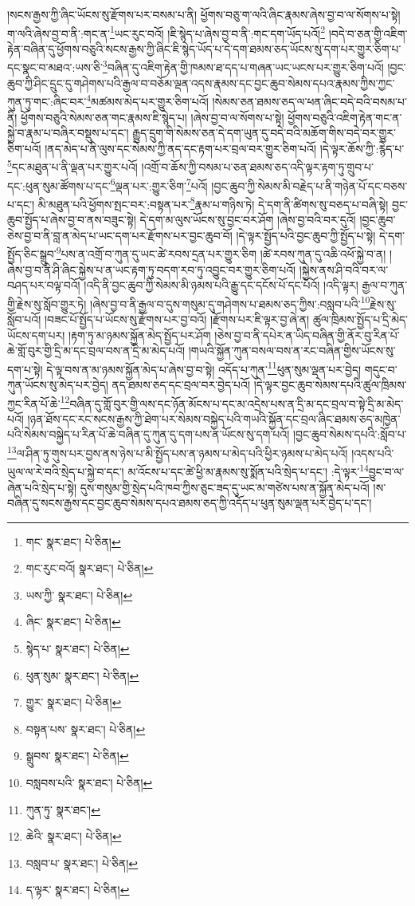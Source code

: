 །སངས་རྒྱས་ཀྱི་ཞིང་ཡོངས་སུ་རྫོགས་པར་བསམ་པ་ནི། ཕྱོགས་བཅུ་ག་ལའི་ཞིང་རྣམས་ཞེས་བྱ་བ་ལ་སོགས་པ་སྟེ། ག་ལའི་ཞེས་བྱ་བ་ནི་:གང་ན་\footnote{གང་  སྣར་ཐང་།  པེ་ཅིན། }ཡང་རུང་བའོ། །ཇི་སྙེད་པ་ཞེས་བྱ་བ་ནི་:གང་དག་ཡོད་པའོ།\footnote{གང་རུང་བའོ།  སྣར་ཐང་།  པེ་ཅིན། } །བདེ་བ་ཅན་གྱི་འཇིག་རྟེན་བཞིན་དུ་ཕྱོགས་བཅུའི་སངས་རྒྱས་ཀྱི་ཞིང་ཇི་སྙེད་ཡོད་པ་དེ་དག་ཐམས་ཅད་ཡོངས་སུ་དག་པར་གྱུར་ཅིག་པ་དང་སྣང་བ་མཐའ་:ཡས་ཅི་\footnote{ཡས་ཀྱི་  སྣར་ཐང་།  པེ་ཅིན། }བཞིན་དུ་འཇིག་རྟེན་གྱི་ཁམས་ཐ་དད་པ་གཞན་ཡང་ཡངས་པར་གྱུར་ཅིག་པའོ། །བྱང་ཆུབ་ཀྱི་ཤིང་དྲུང་དུ་གཤེགས་པའི་རྒྱལ་བ་བཅོམ་ལྡན་འདས་རྣམས་དང་བྱང་ཆུབ་སེམས་དཔའ་རྣམས་ཀྱིས་ཀྱང་ཀུན་ཏུ་གང་:ཞིང་བར་\footnote{ཞིང་  སྣར་ཐང་།  པེ་ཅིན། }མཚམས་མེད་པར་གྱུར་ཅིག་པའོ། །སེམས་ཅན་ཐམས་ཅད་ལ་ཕན་ཞིང་བདེ་བའི་བསམ་པ་ནི། ཕྱོགས་བཅུའི་སེམས་ཅན་གང་རྣམས་ཇི་སྙེད་པ། །ཞེས་བྱ་བ་ལ་སོགས་པ་སྟེ། ཕྱོགས་བཅུའི་འཇིག་རྟེན་གང་ན་སྐྱེ་བ་རྣམ་པ་བཞིར་བསྡུས་པ་དང་། རྒྱུད་དྲུག་གི་སེམས་ཅན་དེ་དག་ཡུན་དུ་བདེ་བའི་མཆོག་གིས་བདེ་བར་གྱུར་ཅིག་པའོ། །ནད་མེད་པ་ནི་ལུས་དང་སེམས་ཀྱི་ནད་དང་རྟག་པར་བྲལ་བར་གྱུར་ཅིག་པའོ། །དེ་ལྟར་ཆོས་ཀྱི་:རྙེད་པ་\footnote{སྙེད་པ་  སྣར་ཐང་།  པེ་ཅིན། }དང་མཐུན་པ་ནི་ལྡན་པར་གྱུར་པའོ། །འགྲོ་བ་ཆོས་ཀྱི་བསམ་པ་ཅན་ཐམས་ཅད་འདི་ལྟར་རྟག་ཏུ་གྲུབ་པ་དང་:ཕུན་སུམ་ཚོགས་པ་དང་\footnote{ཕུན་སུམ་  སྣར་ཐང་།  པེ་ཅིན། }ལྡན་པར་:གྱུར་ཅིག་\footnote{གྱུར་  སྣར་ཐང་།  པེ་ཅིན། }པའོ། །བྱང་ཆུབ་ཀྱི་སེམས་མི་བརྗེད་པ་ནི་གཉེན་པོ་དང་བཅས་པ་དང་། མི་མཐུན་པའི་ཕྱོགས་སྤང་བར་:བསྟན་པར་\footnote{བསྟན་པས་  སྣར་ཐང་།  པེ་ཅིན། }རྣམ་པ་གཉིས་ཏེ། དེ་དག་ནི་ཚིགས་སུ་བཅད་པ་བཞི་སྟེ། བྱང་ཆུབ་སྤྱོད་པ་ཞེས་བྱ་བ་ནས་བཟུང་སྟེ། དེ་དག་མ་ལུས་ཡོངས་སུ་བྱང་བར་ཤོག །ཞེས་བྱ་བའི་བར་དུའོ། །བྱང་ཆུབ་ཅེས་བྱ་བ་ནི་བླ་ན་མེད་པ་ཡང་དག་པར་རྫོགས་པར་བྱང་ཆུབ་བོ། །དེ་ལྟར་སྤྱོད་པའི་བྱང་ཆུབ་ཀྱི་སྤྱོད་པ་སྟེ། དེ་དག་སྤྱོད་ཅིང་སྒྲུབ་\footnote{སྒྲུབས་  སྣར་ཐང་།  པེ་ཅིན། }པས་ན་འགྲོ་བ་ཀུན་དུ་ཡང་ཚེ་རབས་དྲན་པར་གྱུར་ཅིག །ཚེ་རབས་ཀུན་དུ་འཆི་འཕོ་སྐྱེ་བ་ན། །ཞེས་བྱ་བ་ནི་ཤི་ཞིང་སྐྱེས་པ་ན་ཡང་རྟག་ཏུ་བདག་རབ་ཏུ་འབྱུང་བར་གྱུར་ཅིག་པའོ། །སྐྱེས་ནས་ཤི་བའི་བར་ལ་བཤད་པར་བལྟ་བའོ། །འདི་ནི་བྱང་ཆུབ་ཀྱི་སེམས་མི་ཉམས་པའི་རྒྱུ་དང་དངོས་པོ་དང་པོའོ། །འདི་ལྟར། རྒྱལ་བ་ཀུན་གྱི་རྗེས་སུ་སློབ་གྱུར་ཏེ། །ཞེས་བྱ་བ་ནི་རྒྱལ་བ་དུས་གསུམ་དུ་གཤེགས་པ་ཐམས་ཅད་ཀྱིས་:བསླབ་པའི་\footnote{བསླབས་པའི་  སྣར་ཐང་།  པེ་ཅིན། }རྗེས་སུ་སློབ་པའོ། །བཟང་པོ་སྤྱོད་པ་ཡོངས་སུ་རྫོགས་པར་བྱ་བའོ། །རྫོགས་པར་ཇི་ལྟར་བྱ་ཞེ་ན། ཚུལ་ཁྲིམས་སྤྱོད་པ་དྲི་མེད་ཡོངས་དག་པར། །རྟག་ཏུ་མ་ཉམས་སྐྱོན་མེད་སྤྱོད་པར་ཤོག །ཅེས་བྱ་བ་ནི་དཔེར་ན་ཡིད་བཞིན་གྱི་ནོར་བུ་རིན་པོ་ཆེ་གློ་བུར་གྱི་དྲི་མ་དང་བྲལ་བས་ན་དྲི་མ་མེད་པའོ། །གཡའི་སྐྱོན་ཀུན་བསལ་བས་ན་རང་བཞིན་གྱིས་ཡོངས་སུ་དག་པ་སྟེ། དེ་ལྟ་བས་ན་མ་ཉམས་སྐྱོན་མེད་པ་ཞེས་བྱ་བ་སྟེ། འདོད་པ་ཀུན་\footnote{ཀུན་ཏུ་  སྣར་ཐང་། }ཕུན་སུམ་ལྡན་པར་བྱེད། གདུང་བ་ཀུན་ཡོངས་སུ་མེད་པར་བྱེད། ནད་ཐམས་ཅད་དང་བྲལ་བར་བྱེད་པའོ། །དེ་ལྟར་བྱང་ཆུབ་སེམས་དཔའི་ཚུལ་ཁྲིམས་ཀྱང་རིན་པོ་ཆེ་\footnote{ཆེའི་  སྣར་ཐང་།  པེ་ཅིན། }བཞིན་དུ་གློ་བུར་གྱི་ལས་དང་ཉོན་མོངས་པ་དང་མ་འདྲེས་པས་ན་དྲི་མ་དང་བྲལ་བ་སྟེ་དྲི་མ་མེད་པའོ། །ཉན་ཐོས་དང་རང་སངས་རྒྱས་ཀྱི་ཐེག་པར་སེམས་བསྐྱེད་པའི་གཡའི་སྐྱོན་དང་བྲལ་ཞིང་ཐམས་ཅད་མཁྱེན་པའི་སེམས་བསྐྱེད་པ་རིན་པོ་ཆེ་བཞིན་དུ་ཀུན་དུ་དག་པས་ན་ཡོངས་སུ་དག་པའོ། །བྱང་ཆུབ་སེམས་དཔའི་:སློབ་པ་\footnote{བསླབ་པ་  སྣར་ཐང་།  པེ་ཅིན། }ལ་ཤིན་ཏུ་གུས་པར་བྱས་ནས་ཉེས་པ་མི་སྤྱོད་པས་ན་ཉམས་པ་མེད་པའི་ཕྱིར་ཉམས་པ་མེད་པའོ། །འདས་པའི་ཡུལ་ལ་རེ་བའི་སྲེད་པ་སྐྱེ་བ་དང་། མ་འོངས་པ་དང་ཚེ་ཕྱི་མ་རྣམས་སུ་སྨོན་པའི་སྲེད་པ་དང་། :དེ་ལྟར་\footnote{ད་ལྟར་  སྣར་ཐང་།  པེ་ཅིན། }བྱུང་བ་ལ་ཞེན་པའི་སྲེད་པ་སྟེ། དུས་གསུམ་གྱི་སྲེད་པའི་ཁབ་ཀྱིས་ཅུང་ཟད་དུ་ཡང་མ་གཙེས་པས་ན་སྐྱོན་མེད་པའོ། །ས་བཞིན་དུ་སངས་རྒྱས་དང་བྱང་ཆུབ་སེམས་དཔའ་ཐམས་ཅད་ཀྱི་འདོད་པ་ཕུན་སུམ་ལྡན་པར་བྱེད་པ་དང་། 